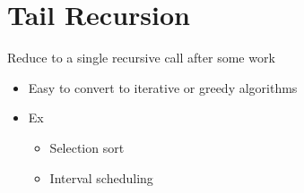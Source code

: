 \chapter{Tail Recursion}

Reduce to a single recursive call after some work

\begin{itemize}
  \item Easy to convert to iterative or greedy algorithms
  \item Ex
  \begin{itemize}
    \item Selection sort
    \item Interval scheduling
  \end{itemize}
\end{itemize}
